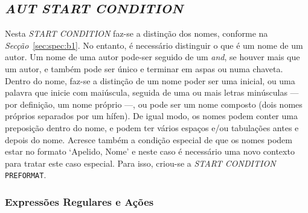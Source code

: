 \subsection{\emph{AUT \emph{START CONDITION}}}

Nesta \emph{START CONDITION} faz-se a distinção dos nomes, conforme na
\emph{Secção}~\ref{sec:spec:b1}. No entanto, é necessário distinguir o que é um
nome de um autor. Um nome de uma autor pode-ser seguido de um \emph{and}, se
houver mais que um autor, e também pode ser único e terminar em aspas ou numa
chaveta. Dentro do nome, faz-se a distinção de um nome poder ser uma inicial, ou
uma palavra que inicie com maiúscula, seguida de uma ou mais letras minúsculas
--- por definição, um nome próprio ---, ou pode ser um nome composto (dois nomes
próprios separados por um hífen). De igual modo, os nomes podem conter uma
preposição dentro do nome, e podem ter vários espaços e/ou tabulações antes
e depois do nome. Acresce também a condição especial de que os nomes podem estar
no formato `Apelido, Nome' e neste caso é necessário uma novo contexto para
tratar este caso especial. Para isso, criou-se a \emph{START CONDITION}
\texttt{PREFORMAT}. 




\subsubsection{Expressões Regulares e Ações}


